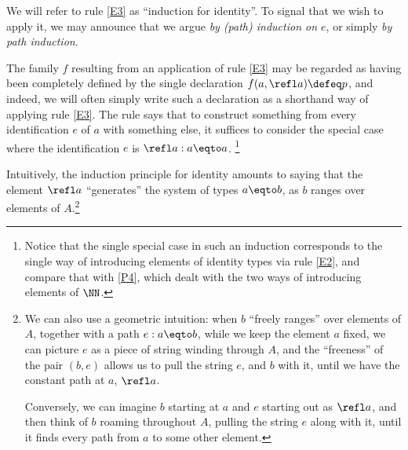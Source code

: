 We will refer to rule \ref{E3} as ``induction for identity''.
To signal that we wish to apply it, we may announce that we argue
\emph{by (path) induction on $e$}, or simply \emph{by path induction}.

The family $f$ resulting from an application of rule \ref{E3} may be regarded as having been completely defined by the single declaration
$f(a,\refl a) \defeq p$,
and indeed, we will often simply write such a declaration as a shorthand way of applying rule \ref{E3}.
The rule says that to construct something from every identification $e$ of $a$ with something else,
it suffices to consider the special case where the identification $e$ is $\refl a : a \eqto a$.%
\footnote{Notice that the single special case in such an induction corresponds to the single way of introducing elements of
identity types via rule \ref{E2}, and compare that with \ref{P4}, which dealt with the two ways of introducing elements of $\NN$.}

Intuitively, the induction principle for identity amounts to saying that the element $\refl a$ ``generates'' the system of types $a \eqto b$, as $b$
ranges over elements of $A$.\footnote{%
  We can also use a geometric intuition: when $b$ ``freely ranges'' over elements of $A$,
  together with a path $e : a \eqto b$,
  while we keep the element $a$ fixed, we can picture $e$ as a piece of string
  winding through $A$, and the ``freeness'' of the pair $(b,e)$ allows us to pull the string $e$,
  and $b$ with it, until we have the constant path at $a$, $\refl a$.\par
  Conversely, we can imagine $b$ starting at $a$ and $e$ starting out as $\refl a$, and then think of $b$ roaming throughout $A$, pulling
  the string $e$ along with it, until it finds every path from $a$ to some other element.
}

